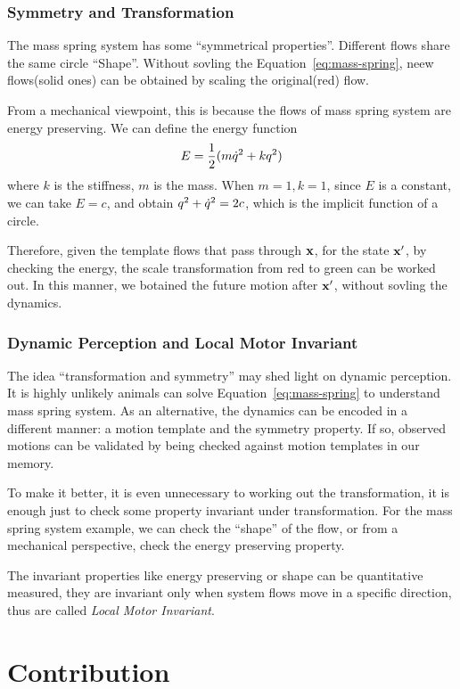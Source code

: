 \subsubsection*{Symmetry and Transformation}

The mass spring system has some ``symmetrical properties''.
Different flows share the same circle ``Shape''.
Without sovling the Equation~\ref{eq:mass-spring}, neew flows(solid ones) can be obtained by scaling the original(red) flow.

From a mechanical viewpoint, this is because the flows of mass spring system are energy preserving.
We can define the energy function
\[
E=\frac{1}{2}(m\dot{q}^2+kq^2)
\]
where $k$ is the stiffness, $m$ is the mass.
When $m=1,k=1$, since $E$ is a constant, we can take $E=c$,
and obtain $q^2+\dot{q}^2=2c$, which is the implicit function of a circle.

Therefore, given the template flows that pass through  $\mathbf{x}$, for the state $\mathbf{x}'$, by checking the energy, the scale transformation from red to green can be worked out.
In this manner, we botained the future motion after $\mathbf{x}'$, without sovling the dynamics.


\subsubsection*{Dynamic Perception and Local Motor Invariant}

The idea ``transformation and symmetry'' may shed light on dynamic perception. 
It is highly unlikely animals can solve Equation~\ref{eq:mass-spring} to understand mass spring system.
As an alternative, the dynamics can be encoded in a different manner: a motion template and the symmetry property. 
If so, observed motions can be validated by being checked against motion templates in our memory.

To make it better, it is even unnecessary to working out the transformation, it is enough just to check some property invariant under transformation.
For the mass spring system example, we can check the “shape” of the flow, or from a mechanical perspective, check the energy preserving property.

 
The invariant properties like energy preserving or shape can be quantitative measured, they are invariant only when system flows move in a specific direction, thus are called  \emph{Local Motor Invariant}. 


\section{Contribution}

